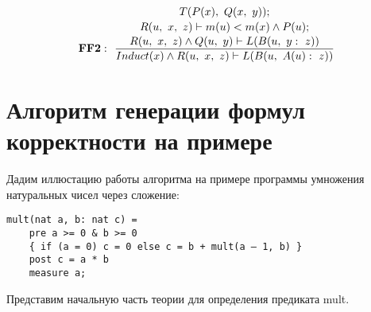 \documentclass[10pt,a4paper]{article}
\newcommand{\ruleI}[3] {
$$
\mathbf{#1:} ~~
\frac{#2}{#3}
$$
}
\newcommand{\ruleII}[4] {
\ruleI{#1}
{\genfrac{}{}{0pt}{0}{#2}{#3}}
{#4}
}
\newcommand{\ruleIII}[5] {
\ruleII{#1}
{\genfrac{}{}{0pt}{0}{#2}{#3}}
{#4}
{#5}
}
\begin{document}
\ruleIII{FF2}
{T(P(x),~Q(x,~y));}
{R(u,~x,~z) \vdash m(u)<m(x) \land P(u);}
{R(u,~x,~z) \land Q(u,~y) \vdash L(B(u,~y:~z))}
{Induct(x) \land R(u,~x,~z) \vdash L(B(u,~A(u):~z))}


\section{Алгоритм генерации формул корректности на примере}

Дадим иллюстацию работы алгоритма на примере программы умножения натуральных чисел через сложение:

\begin{lstlisting}
mult(nat a, b: nat c) =
    pre a >= 0 & b >= 0
    { if (a = 0) c = 0 else c = b + mult(a – 1, b) }
    post c = a * b
    measure a;
\end{lstlisting}

Представим начальную часть теории для определения предиката mult.
\end{document}

